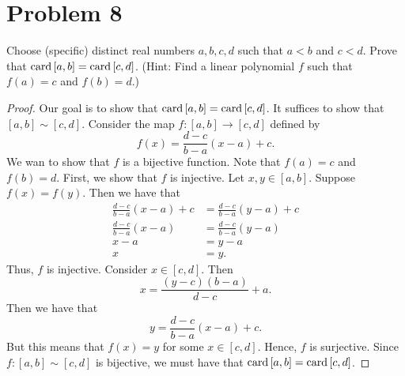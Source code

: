 \documentclass[11pt,a4paper]{article}
\begin{document}
\section*{Problem 8} Choose (specific) distinct real numbers \( a,b,c,d  \) such that \( a < b  \) and \( c < d  \). Prove that \( \operatorname{card}{[a,b]} = \operatorname{card}{[c,d]}  \). (Hint: Find a linear polynomial \( f  \) such that \( f(a) = c  \) and \( f(b) = d  \).)
\begin{proof}
    Our goal is to show that \( \operatorname{card}{[a,b]} = \operatorname{card}{[c,d]} \). It suffices to show that \( [a,b] \sim [c,d] \). Consider the map \( f: [a,b] \to [c,d] \) defined by
\[  f(x) = \frac{ d - c  }{  b - a  } (x-a) + c.    \]
We wan to show that \( f  \) is a bijective function.
Note that \( f(a) = c  \) and \( f(b) = d   \). First, we show that \( f  \) is injective. Let \( x,y \in [a,b]  \). Suppose \( f(x) = f(y) \). Then we have that  
\begin{align*}
    \frac{ d - c  }{  b - a  } ( x- a) + c &= \frac{ d - c  }{ b - a  }  (y - a) + c  \\
    \frac{ d - c  }{  b - a  }  (x -a) &= \frac{ d - c  }{  b - a  }  (y-a) \\
    x - a &= y - a \\
    x &= y.
\end{align*}
Thus, \( f  \) is injective. Consider \( x \in [c,d] \). Then 
\[  x = \frac{ (y-c) (b-a) }{ d - c  } + a. \]
Then we have that 
\[  y = \frac{ d - c  }{  b - a  }  (x - a ) + c. \]
But this means that \( f(x) = y \) for some \( x \in [c,d] \). Hence, \( f  \) is surjective. Since \( f: [a,b] \sim [c,d] \) is bijective, we must have that \( \operatorname{card}{[a,b]} = \operatorname{card}{[c,d]} \).
\end{proof}
\end{document}
